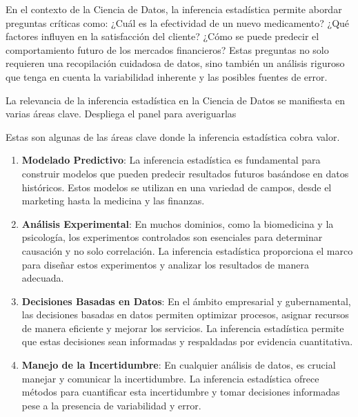 \documentclass[
  letterpaper,
  DIV=11,
  numbers=noendperiod]{scrreprt}
\begin{document}
En el contexto de la Ciencia de Datos, la inferencia estadística permite
abordar preguntas críticas como: ¿Cuál es la efectividad de un nuevo
medicamento? ¿Qué factores influyen en la satisfacción del cliente?
¿Cómo se puede predecir el comportamiento futuro de los mercados
financieros? Estas preguntas no solo requieren una recopilación
cuidadosa de datos, sino también un análisis riguroso que tenga en
cuenta la variabilidad inherente y las posibles fuentes de error.

La relevancia de la inferencia estadística en la Ciencia de Datos se
manifiesta en varias áreas clave. Despliega el panel para averiguarlas

\begin{tcolorbox}[enhanced jigsaw, arc=.35mm, breakable, coltitle=black, left=2mm, opacityback=0, bottomtitle=1mm, colbacktitle=quarto-callout-note-color!10!white, title=\textcolor{quarto-callout-note-color}{\faInfo}\hspace{0.5em}{Áreas clave}, titlerule=0mm, colback=white, colframe=quarto-callout-note-color-frame, bottomrule=.15mm, rightrule=.15mm, opacitybacktitle=0.6, toptitle=1mm, toprule=.15mm, leftrule=.75mm]

Estas son algunas de las áreas clave donde la inferencia estadística
cobra valor.

\begin{enumerate}
\def\labelenumi{\arabic{enumi}.}
\item
  \textbf{Modelado Predictivo}: La inferencia estadística es fundamental
  para construir modelos que pueden predecir resultados futuros
  basándose en datos históricos. Estos modelos se utilizan en una
  variedad de campos, desde el marketing hasta la medicina y las
  finanzas.
\item
  \textbf{Análisis Experimental}: En muchos dominios, como la
  biomedicina y la psicología, los experimentos controlados son
  esenciales para determinar causación y no solo correlación. La
  inferencia estadística proporciona el marco para diseñar estos
  experimentos y analizar los resultados de manera adecuada.
\item
  \textbf{Decisiones Basadas en Datos}: En el ámbito empresarial y
  gubernamental, las decisiones basadas en datos permiten optimizar
  procesos, asignar recursos de manera eficiente y mejorar los
  servicios. La inferencia estadística permite que estas decisiones sean
  informadas y respaldadas por evidencia cuantitativa.
\item
  \textbf{Manejo de la Incertidumbre}: En cualquier análisis de datos,
  es crucial manejar y comunicar la incertidumbre. La inferencia
  estadística ofrece métodos para cuantificar esta incertidumbre y tomar
  decisiones informadas pese a la presencia de variabilidad y error.
\end{enumerate}

\end{tcolorbox}
\end{document}
